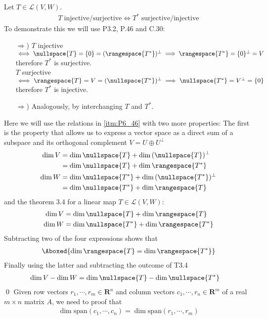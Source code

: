 \exo{} Let $T\in\mathcal{L}(V,W)$. 
\begin{align*}
T\; \textrm{injective/surjective} \iff T^*\; \textrm{surjective/injective}
\end{align*}
To demonstrate this we will use P3.2, P.46 and C.30:
\begin{enumerate}
\item[$\Rightarrow$)] $T$ injective $\iff \nullspace{T} = \{0\} = (\rangespace{T^*})^\perp \implies \rangespace{T^*} = \{0\}^\perp = V$ therefore $T^*$ is surjective.\\
$T$ surjective $\iff \rangespace{T} = V = (\nullspace{T^*})^\perp \implies \nullspace{T^*} = V^\perp = \{0\}$ therefore $T^*$ is injective.
\item[$\Rightarrow$)] Analogously, by interchanging $T$ and $T^*$.

\end{enumerate}

\exo{} Here we will use the relations in \ref{itm:P6_46} with two more properties: The first is the property that allows us to express a vector space as a direct sum of a subspace and its orthogonal complement $V = U\oplus U^\perp$ 
\begin{align*}
\dim{V} &= \dim{\nullspace{T}} + \dim{(\nullspace{T})^\perp} \\&=  \dim{\nullspace{T}} + \dim{\rangespace{T^*}} \\
\dim{W} &= \dim{\nullspace{T^*}} + \dim{(\nullspace{T^*})^\perp} \\&= \dim{\nullspace{T^*}} + \dim{\rangespace{T}}
\end{align*}
and the theorem 3.4 for a linear map $T\in\mathcal{L}(V,W)$:
\begin{align*}
\dim{V} &= \dim{\nullspace{T}} + \dim{\rangespace{T}} \\
\dim{W} &= \dim{\nullspace{T^*}} + \dim{\rangespace{T^*}}
\end{align*}
Subtracting two of the four expressions shows that
\begin{align*}
\Aboxed{\dim{\rangespace{T}} = \dim{\rangespace{T^*}}}
\end{align*}
Finally using the latter and subtracting the outcome of T3.4
\begin{align*}
\dim{V} - \dim{W} &= \dim{\nullspace{T}} - \dim{\nullspace{T^*}}
\end{align*} 
\qed
\exo{} Given row vectors $r_1,\cdots,r_m\in\mathbf{R}^n$ and column vectors $c_1,\cdots,r_n\in\mathbf{R}^m$ of a real $m\times n$ matrix $A$, we need to proof that
\begin{align*}
\dim{\mathrm{span}(c_1,\cdots,c_n)} = \dim{\mathrm{span}(r_1,\cdots,r_m)}  
\end{align*}


